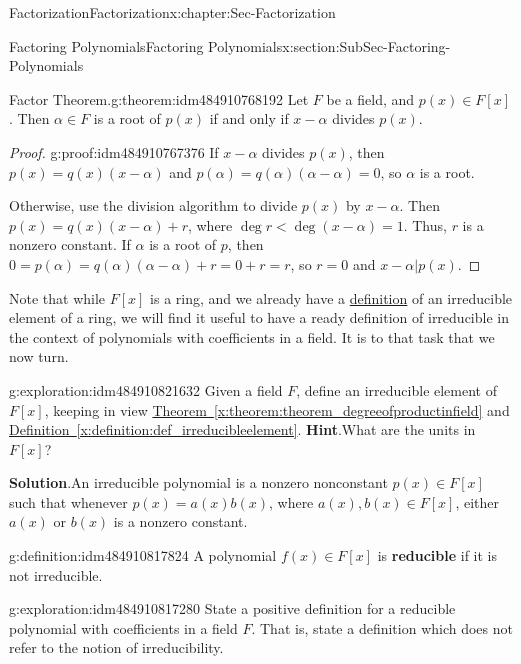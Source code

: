 \documentclass[oneside,10pt,]{book}
\newcommand{\blocktitlefont}{\relax}
\newcommand{\xreffont}{\relax}
\newcommand{\terminology}[1]{\textbf{#1}}
\numberwithin{equation}{section}
\newcommand{\lt}{<}
\begin{document}
\begin{chapterptx}{Factorization}{}{Factorization}{}{}{x:chapter:Sec-Factorization}
\begin{sectionptx}{Factoring Polynomials}{}{Factoring Polynomials}{}{}{x:section:SubSec-Factoring-Polynomials}
\begin{theorem}{Factor Theorem.}{}{g:theorem:idm484910768192}%
Let \(F\) be a field, and \(p(x)\in F[x]\). Then \(\alpha\in F\) is a root of \(p(x)\) if and only if \(x-\alpha\) divides \(p(x)\).%
\end{theorem}
\begin{proof}{}{g:proof:idm484910767376}
If \(x-\alpha\) divides \(p(x)\), then \(p(x) = q(x) (x-\alpha)\) and \(p(\alpha) = q(\alpha) (\alpha - \alpha) = 0\), so \(\alpha\) is a root.%
\par
Otherwise, use the division algorithm to divide \(p(x)\) by \(x-\alpha\). Then \(p(x) = q(x)(x-\alpha) + r\), where \(\deg r \lt \deg (x-\alpha) = 1\). Thus, \(r\) is a nonzero constant. If \(\alpha\) is a root of \(p\), then \(0 = p(\alpha) = q(\alpha) (\alpha - \alpha) + r = 0 + r = r\), so \(r=0\) and \(x-\alpha | p(x)\).%
\end{proof}
Note that while \(F[x]\) is a ring, and we already have a \hyperref[x:definition:def_irreducibleelement]{definition} of an irreducible element of a ring, we will find it useful to have a ready definition of irreducible in the context of polynomials with coefficients in a field. It is to that task that we now turn.%
\begin{exploration}{}{g:exploration:idm484910821632}%
Given a field \(F\), define an irreducible element of \(F[x]\), keeping in view \hyperref[x:theorem:theorem_degreeofproductinfield]{Theorem~{\xreffont\ref{x:theorem:theorem_degreeofproductinfield}}} and \hyperref[x:definition:def_irreducibleelement]{Definition~{\xreffont\ref{x:definition:def_irreducibleelement}}}. 
\textbf{\blocktitlefont Hint}.\quad{}What are the units in \(F[x]\)?%
\par\smallskip%
\noindent\textbf{\blocktitlefont Solution}.\hypertarget{g:solution:idm484910820896}{}\quad{}An irreducible polynomial is a nonzero nonconstant \(p(x)\in F[x]\) such that whenever \(p(x) = a(x) b(x)\), where \(a(x), b(x) \in F[x]\), either \(a(x)\) or \(b(x)\) is a nonzero constant.%
\end{exploration}
\begin{definition}{}{g:definition:idm484910817824}%
%
A polynomial \(f(x)\in F[x]\) is \terminology{reducible} if it is not irreducible.%
\end{definition}
\begin{exploration}{}{g:exploration:idm484910817280}%
State a positive definition for a reducible polynomial with coefficients in a field \(F\). That is, state a definition which does not refer to the notion of irreducibility.%

\end{exploration}
\end{sectionptx}
\end{chapterptx}
\end{document}
